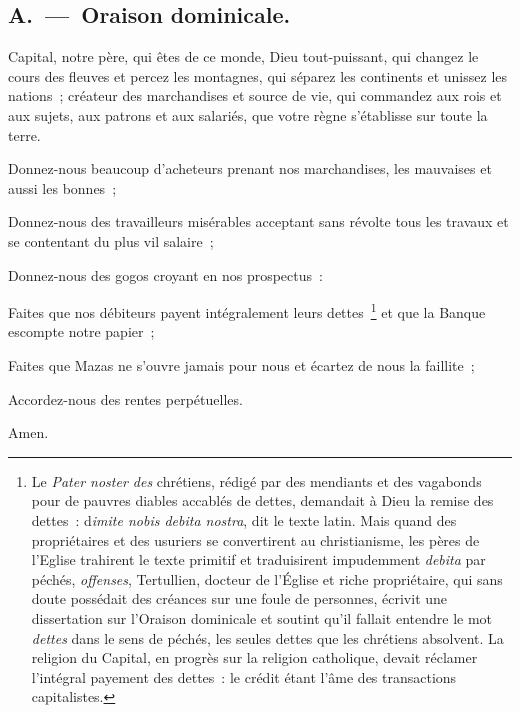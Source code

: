 \documentclass[french,twoside]{book} %
\begin{document}
\subsection[{A. — Oraison dominicale.}]{A. — Oraison dominicale.}
\noindent Capital, notre père, qui êtes de ce monde, Dieu tout-puissant, qui changez le cours des fleuves et percez les montagnes, qui séparez les continents et unissez les nations ; créateur des marchandises et source de vie, qui commandez aux rois et aux sujets, aux patrons et aux salariés, que votre règne s’établisse sur toute la terre.\par
Donnez-nous beaucoup d’acheteurs prenant nos marchandises, les mauvaises et aussi les bonnes ;\par
Donnez-nous des travailleurs misérables acceptant sans révolte tous les travaux et se contentant du plus vil salaire ;\par
Donnez-nous des gogos croyant en nos prospectus :\par
Faites que nos débiteurs payent intégralement leurs dettes \footnote{Le \emph{Pater noster des} chrétiens, rédigé par des mendiants et des vagabonds pour de pauvres diables accablés de dettes, demandait à Dieu la remise des dettes : d\emph{imite nobis debita nostra}, dit le texte latin. Mais quand des propriétaires et des usuriers se convertirent au christianisme, les pères de l’Eglise trahirent le texte primitif et traduisirent impudemment \emph{debita} par péchés, \emph{offenses}, Tertullien, docteur de l’Église et riche propriétaire, qui sans doute possédait des créances sur une foule de personnes, écrivit une dissertation sur l’Oraison dominicale et soutint qu’il fallait entendre le mot \emph{dettes} dans le sens de péchés, les seules dettes que les chrétiens absolvent. La religion du Capital, en progrès sur la religion catholique, devait réclamer l’intégral payement des dettes : le crédit étant l’âme des transactions capitalistes.} et que la Banque escompte notre papier ;\par
Faites que Mazas ne s’ouvre jamais pour nous et écartez de nous la faillite ;\par
Accordez-nous des rentes perpétuelles.\par

\begin{center}
\noindent Amen.
\end{center}
\end{document}
